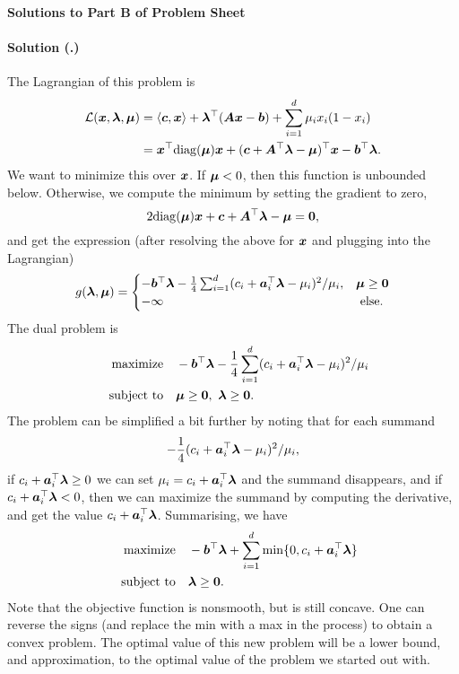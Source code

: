 \documentclass{article}
\newcounter{problemSheetNumber}
\newcounter{problems}
\renewcommand{\solution}[1]{\paragraph{Solution (\theproblemSheetNumber.\theproblems)}\addtocounter{problems}{1}\label{#1}}
\begin{document}
 
\begin{center}
{\Large {\bf Solutions to Part B of Problem Sheet \theproblemSheetNumber}}
\end{center}

\solution{pr:1} The Lagrangian of this problem is
\begin{align*}
 \mathcal{L}(\bm{x},\bm{\lambda},\bm{\mu}) &= \langle {\bm{c}}, {\bm{x}} \rangle+\bm{\lambda}^{\top}(\bm{A}\bm{x}-\bm{b}) + \sum_{i=1}^d \mu_i x_i(1-x_i)\\
 &= \bm{x}^{\top}\mathrm{diag}(\bm{\mu})\bm{x}+(\bm{c}+\bm{A}^{\top}\bm{\lambda}-\bm{\mu})^{\top}\bm{x}-\bm{b}^{\top}\bm{\lambda}.
\end{align*}
We want to minimize this over $\bm{x}$. If $\bm{\mu}<0$, then this function is unbounded below. Otherwise, we compute the minimum by setting the gradient to zero,
\begin{equation*}
 2\mathrm{diag}(\bm{\mu})\bm{x}+\bm{c}+\bm{A}^{\top}\bm{\lambda}-\bm{\mu} = \bm{0},
\end{equation*}
and get the expression (after resolving the above for $\bm{x}$ and plugging into the Lagrangian)
\begin{equation*}
 g(\bm{\lambda},\bm{\mu}) = \begin{cases}
                               -\bm{b}^{\top}\bm{\lambda}-\frac{1}{4}\sum_{i=1}^d (c_i+\bm{a}_i^{\top}\bm{\lambda}-\mu_i)^2/\mu_i, & \bm{\mu}\geq \bm{0}\\
                               -\infty & \text{ else.}
                              \end{cases}
\end{equation*}
The dual problem is
\begin{align*}
 \text{maximize}\quad & -\bm{b}^{\top}\bm{\lambda}-\frac{1}{4}\sum_{i=1}^d (c_i+\bm{a}_i^{\top}\bm{\lambda}-\mu_i)^2/\mu_i\\
 \quad\text{subject to}\quad & \bm{\mu}\geq \bm{0}, \ \bm{\lambda}\geq \bm{0}.
\end{align*}
The problem can be simplified a bit further by noting that for each summand
\begin{equation*}
 -\frac{1}{4}(c_i+\bm{a}_i^{\top}\bm{\lambda}-\mu_i)^2/\mu_i,
\end{equation*}
if $c_i+\bm{a}_i^{\top}\bm{\lambda}\geq 0$ we can set $\mu_i=c_i+\bm{a}_i^{\top}\bm{\lambda}$ and the summand disappears, and if $c_i+\bm{a}_i^{\top}\bm{\lambda}<0$, then we can maximize the summand by computing the derivative, and get the value $c_i+\bm{a}_i^{\top}\bm{\lambda}$. Summarising, we have
\begin{align*}
 \text{maximize}\quad & -\bm{b}^{\top}\bm{\lambda}+\sum_{i=1}^d \min\{0,c_i+\bm{a}_i^{\top}\bm{\lambda}\}\\
 \quad\text{subject to}\quad & \bm{\lambda}\geq \bm{0}.
\end{align*}
Note that the objective function is nonsmooth, but is still concave. One can reverse the signs (and replace the min with a max in the process) to obtain a convex problem. The optimal value of this new problem will be a lower bound, and approximation, to the optimal value of the problem we started out with.
\end{document}
